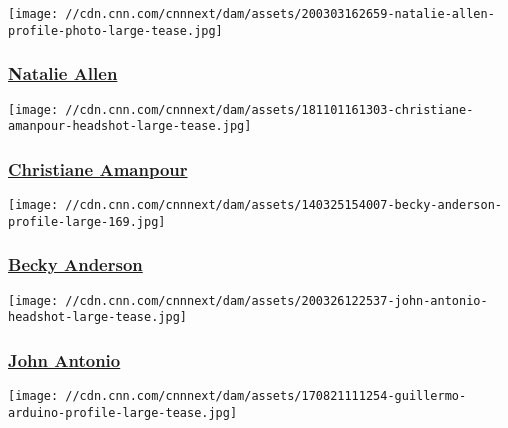 \href{/profiles/natalie-allen-profile}{}

\texttt{[image: //cdn.cnn.com/cnnnext/dam/assets/200303162659-natalie-allen-profile-photo-large-tease.jpg]}

\hypertarget{natalie-allen}{%
\subsubsection{\texorpdfstring{\href{/profiles/natalie-allen-profile}{Natalie
Allen}}{Natalie Allen}}\label{natalie-allen}}

\href{/profiles/christiane-amanpour-profile}{}

\texttt{[image: //cdn.cnn.com/cnnnext/dam/assets/181101161303-christiane-amanpour-headshot-large-tease.jpg]}

\hypertarget{christiane-amanpour}{%
\subsubsection{\texorpdfstring{\href{/profiles/christiane-amanpour-profile}{Christiane
Amanpour}}{Christiane Amanpour}}\label{christiane-amanpour}}

\href{/profiles/becky-anderson-profile}{}

\texttt{[image: //cdn.cnn.com/cnnnext/dam/assets/140325154007-becky-anderson-profile-large-169.jpg]}

\hypertarget{becky-anderson}{%
\subsubsection{\texorpdfstring{\href{/profiles/becky-anderson-profile}{Becky
Anderson}}{Becky Anderson}}\label{becky-anderson}}

\href{/profiles/john-anotnio-profile}{}

\texttt{[image: //cdn.cnn.com/cnnnext/dam/assets/200326122537-john-antonio-headshot-large-tease.jpg]}

\hypertarget{john-antonio}{%
\subsubsection{\texorpdfstring{\href{/profiles/john-anotnio-profile}{John
Antonio}}{John Antonio}}\label{john-antonio}}

\href{/profiles/guillermo-arduino-profile}{}

\texttt{[image: //cdn.cnn.com/cnnnext/dam/assets/170821111254-guillermo-arduino-profile-large-tease.jpg]}

